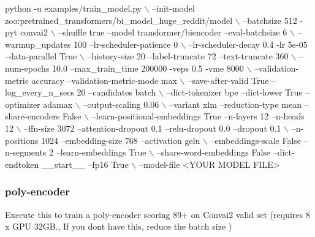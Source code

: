 \begin{DoxyCode}
python -u examples/train\_model.py \(\backslash\)
    --init-model zoo:pretrained\_transformers/bi\_model\_huge\_reddit/model \(\backslash\)
    --batchsize 512 -pyt convai2 \(\backslash\)
    --shuffle true --model transformer/biencoder --eval-batchsize 6 \(\backslash\)
    --warmup\_updates 100 --lr-scheduler-patience 0 \(\backslash\)
    --lr-scheduler-decay 0.4 -lr 5e-05 --data-parallel True \(\backslash\)
    --history-size 20 --label-truncate 72 --text-truncate 360 \(\backslash\)
    --num-epochs 10.0 --max\_train\_time 200000 -veps 0.5 -vme 8000 \(\backslash\)
    --validation-metric accuracy --validation-metric-mode max \(\backslash\)
    --save-after-valid True --log\_every\_n\_secs 20 --candidates batch \(\backslash\)
    --dict-tokenizer bpe --dict-lower True --optimizer adamax \(\backslash\)
    --output-scaling 0.06 \(\backslash\)
     --variant xlm --reduction-type mean --share-encoders False \(\backslash\)
     --learn-positional-embeddings True --n-layers 12 --n-heads 12 \(\backslash\)
     --ffn-size 3072 --attention-dropout 0.1 --relu-dropout 0.0 --dropout 0.1 \(\backslash\)
     --n-positions 1024 --embedding-size 768 --activation gelu \(\backslash\)
     --embeddings-scale False --n-segments 2 --learn-embeddings True \(\backslash\)
     --share-word-embeddings False --dict-endtoken \_\_start\_\_ --fp16 True \(\backslash\)
     --model-file <YOUR MODEL FILE>
\end{DoxyCode}


\subsubsection*{poly-\/encoder}

Execute this to train a poly-\/encoder scoring 89+ on Convai2 valid set (requires 8 x G\+PU 32\+GB., If you don\textquotesingle{}t have this, reduce the batch size )


